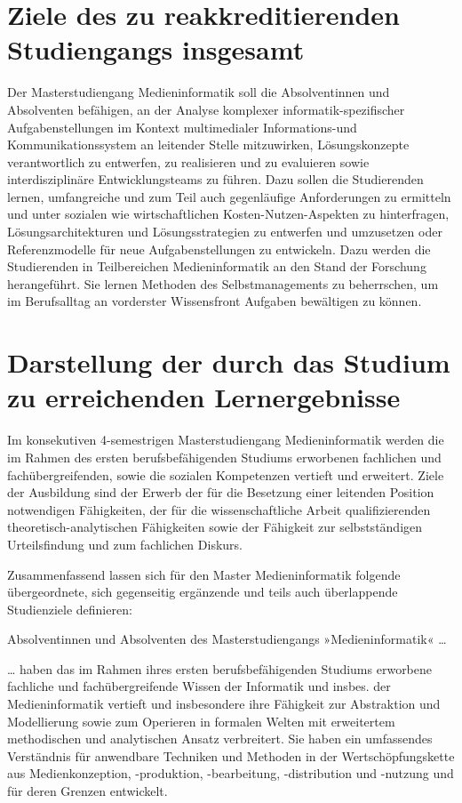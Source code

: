 \section{Ziele des zu reakkreditierenden Studiengangs
insgesamt}\label{ziele-des-zu-reakkreditierenden-studiengangs-insgesamt}

Der Masterstudiengang Medieninformatik soll die Absolventinnen und
Absolventen befähigen, an der Analyse komplexer informatik-spezifischer
Aufgabenstellungen im Kontext multimedialer Informations-und
Kommunikationssystem an leitender Stelle mitzuwirken, Lösungskonzepte
verantwortlich zu entwerfen, zu realisieren und zu evaluieren sowie
interdisziplinäre Entwicklungsteams zu führen. Dazu sollen die
Studierenden lernen, umfangreiche und zum Teil auch gegenläufige
Anforderungen zu ermitteln und unter sozialen wie wirtschaftlichen
Kosten-Nutzen-Aspekten zu hinterfragen, Lösungsarchitekturen und
Lösungsstrategien zu entwerfen und umzusetzen oder Referenzmodelle für
neue Aufgabenstellungen zu entwickeln. Dazu werden die Studierenden in
Teilbereichen Medieninformatik an den Stand der Forschung herangeführt.
Sie lernen Methoden des Selbstmanagements zu beherrschen, um im
Berufsalltag an vorderster Wissensfront Aufgaben bewältigen zu können.

\section{Darstellung der durch das Studium zu erreichenden
Lernergebnisse}\label{darstellung-der-durch-das-studium-zu-erreichenden-lernergebnisse}

Im konsekutiven 4-semestrigen Masterstudiengang Medieninformatik werden
die im Rahmen des ersten berufsbefähigenden Studiums erworbenen
fachlichen und fachübergreifenden, sowie die sozialen Kompetenzen
vertieft und erweitert. Ziele der Ausbildung sind der Erwerb der für die
Besetzung einer leitenden Position notwendigen Fähigkeiten, der für die
wissenschaftliche Arbeit qualifizierenden theoretisch-analytischen
Fähigkeiten sowie der Fähigkeit zur selbstständigen Urteilsfindung und
zum fachlichen Diskurs.

Zusammenfassend lassen sich für den Master Medieninformatik folgende
übergeordnete, sich gegenseitig ergänzende und teils auch überlappende
Studienziele definieren:

Absolventinnen und Absolventen des Masterstudiengangs »Medieninformatik«
\ldots{}

\ldots{} haben das im Rahmen ihres ersten berufsbefähigenden Studiums
erworbene fachliche und fachübergreifende Wissen der Informatik und
insbes. der Medieninformatik vertieft und insbesondere ihre Fähigkeit
zur Abstraktion und Modellierung sowie zum Operieren in formalen Welten
mit erweitertem methodischen und analytischen Ansatz verbreitert. Sie
haben ein umfassendes Verständnis für anwendbare Techniken und Methoden
in der Wertschöpfungskette aus Medienkonzeption, -produktion,
-bearbeitung, -distribution und -nutzung und für deren Grenzen
entwickelt.

